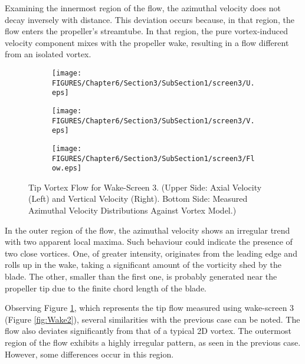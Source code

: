 Examining the innermost region of the flow, the azimuthal velocity does not decay inversely with distance. This deviation occurs because, in that region, the flow enters the propeller’s streamtube. In that region, the pure vortex-induced velocity component mixes with the propeller wake, resulting in a flow different from an isolated vortex.

\begin{figure}[htbp]
    \centering
    \begin{subfigure}[b]{0.48\textwidth}
        \centering
        \texttt{[image: FIGURES/Chapter6/Section3/SubSection1/screen3/U.eps]}
    \end{subfigure}
    \hfill
    \begin{subfigure}[b]{0.48\textwidth}
        \centering
        \texttt{[image: FIGURES/Chapter6/Section3/SubSection1/screen3/V.eps]}
    \end{subfigure}
    
    \vspace{1cm} 
    
    \begin{subfigure}[b]{0.75\textwidth}
        \centering
        \texttt{[image: FIGURES/Chapter6/Section3/SubSection1/screen3/Flow.eps]}
    \end{subfigure}
    \caption{Tip Vortex Flow for Wake-Screen 3. (Upper Side: Axial Velocity (Left) and Vertical Velocity (Right). Bottom Side: Measured Azimuthal Velocity Distributions Against Vortex Model.)}
    \label{fig:ViscousCore3}
\end{figure}

In the outer region of the flow, the azimuthal velocity shows an irregular trend with two apparent local maxima. Such behaviour could indicate the presence of two close vortices. One, of greater intensity, originates from the leading edge and rolls up in the wake, taking a significant amount of the vorticity shed by the blade. The other, smaller than the first one, is probably generated near the propeller tip due to the finite chord length of the blade.

Observing Figure \ref{fig:ViscousCore3}, which represents the tip flow measured using wake-screen 3 (Figure \ref{fig:Wake2}), several similarities with the previous case can be noted. The flow also deviates significantly from that of a typical 2D vortex. The outermost region of the flow exhibits a highly irregular pattern, as seen in the previous case. However, some differences occur in this region.

